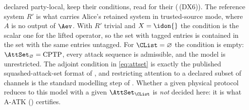 \begin{definition}
declared party-local, keep their conditions, read for their
(\,(DX6)). The reference system $R'$ is what
carries Alice's retained system in trusted-source mode, where $A$ is no
output of $\Aev$. With $R'$ trivial and $X=\idon{}$ the condition is the
scalar one for the lifted operator, so the set with tagged entries is
contained in the set with the same entries untagged. For
$\CList=\varnothing$ the condition is empty:
$\AttSet_{\varnothing}=\mathrm{CPTP}$, every attack sequence is
admissible, and the model is unrestricted. The adjoint condition in
\eqref{eq:attset} is exactly the published squashed-attack-set format
of \cite[Eq.~(151)]{tupkary2026decoy}, and
restricting attention to a declared subset of channels is the standard
modelling step of \cite[Def.~8.3, Rem.~8.4]{tupkary2026decoy}. Whether
a given physical protocol reduces to this model with a given
$\AttSet_{\CList}$ is \emph{not} decided here: it is what
A-ATK () certifies.
\end{definition}


